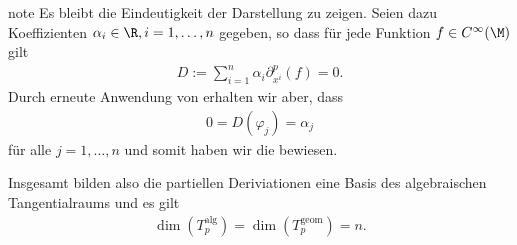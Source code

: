 \documentclass[letterpaper,10pt,german]{jupyterBook}
\begin{document}
\begin{sphinxadmonition}{note}
\sphinxAtStartPar
Es bleibt die Eindeutigkeit der Darstellung zu zeigen.
Seien dazu Koeffizienten \(\alpha_i \in \R, i=1,\ldots,n\) gegeben, so dass für jede Funktion \(f\in C^\infty(\M)\) gilt
\begin{equation*}
\begin{split}D:= \sum_{i=1}^n \alpha_i \partial_{x^i}^p(f) = 0.\end{split}
\end{equation*}
\sphinxAtStartPar
Durch erneute Anwendung von {\hyperref[\detokenize{manifolds/tangential:lem:partderkron}]{}} erhalten wir aber, dass
\begin{equation*}
\begin{split}0 = D(\varphi_j) = \alpha_j \end{split}
\end{equation*}
\sphinxAtStartPar
für alle \(j=1,\ldots,n\) und somit haben wir die  bewiesen.

\sphinxAtStartPar
Insgesamt bilden also die partiellen Deriviationen eine Basis des algebraischen Tangentialraums und es gilt
\begin{equation*}
\begin{split}\dim(T^{\text{alg}}_p)=\dim(T^{\text{geom}}_p)=n.\end{split}
\end{equation*}\end{sphinxadmonition}
\end{document}
